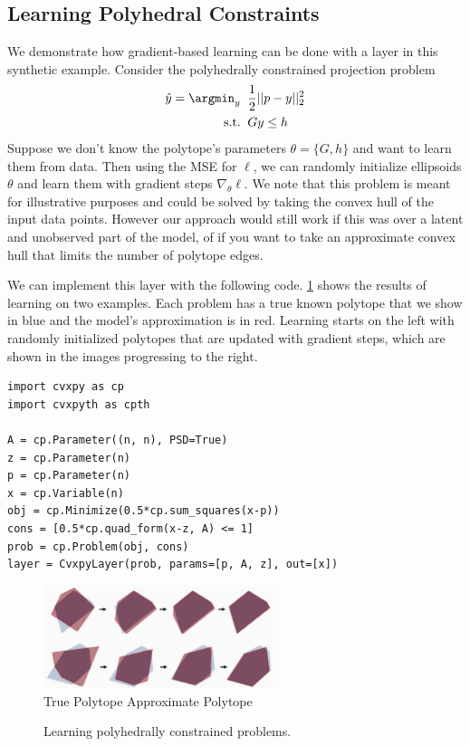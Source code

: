 \subsection{Learning Polyhedral Constraints}
We demonstrate how gradient-based learning can be done with
a \cvxpy layer in this synthetic example.
Consider the polyhedrally constrained
projection problem
\begin{align*}
\hat y = \argmin_y\;\; &\frac{1}{2}||p-y||_2^2  \\
 {\rm s.t.}\;\; & Gy\leq h \\
\end{align*}
Suppose we don't know the polytope's parameters $\theta=\{G, h\}$
and want to learn them from data.
Then using the MSE for $\ell$, we can randomly initialize
ellipsoids $\theta$ and learn them with gradient steps $\nabla_\theta \ell$.
We note that this problem is meant for illustrative purposes and
could be solved by taking the convex hull of the input data points.
However our approach would still work if this was over a latent
and unobserved part of the model, of if you want to take an
approximate convex hull that limits the number of polytope edges.

We can implement this layer with the following code.
\cref{fig:polytope-results} shows the results of learning
on two examples.
Each problem has a true known polytope that we show in blue
and the model's approximation is in red.
Learning starts on the left with randomly initialized
polytopes that are updated with gradient steps,
which are shown in the images progressing to the right.

\begin{lstlisting}
import cvxpy as cp
import cvxpyth as cpth

A = cp.Parameter((n, n), PSD=True)
z = cp.Parameter(n)
p = cp.Parameter(n)
x = cp.Variable(n)
obj = cp.Minimize(0.5*cp.sum_squares(x-p))
cons = [0.5*cp.quad_form(x-z, A) <= 1]
prob = cp.Problem(obj, cons)
layer = CvxpyLayer(prob, params=[p, A, z], out=[x])
\end{lstlisting}

\begin{figure}[t]
  \centering
  \includegraphics[width=0.6\textwidth]{polytope-frames.png} \\
   True Polytope \enskip
   Approximate Polytope
  \caption{
    Learning polyhedrally constrained problems.
  }
  \label{fig:polytope-results}
\end{figure}

